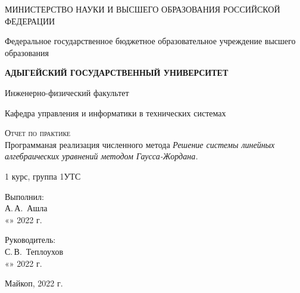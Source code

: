 \documentclass[12pt,a4paper]{scrartcl}
\begin{document}
	\begin{titlepage}
		\begin{center}
			\large
			МИНИСТЕРСТВО НАУКИ И ВЫСШЕГО ОБРАЗОВАНИЯ РОССИЙСКОЙ ФЕДЕРАЦИИ
			
			Федеральное государственное бюджетное образовательное учреждение высшего образования
			
			\textbf{АДЫГЕЙСКИЙ ГОСУДАРСТВЕННЫЙ УНИВЕРСИТЕТ}
			\vspace{0.25cm}
			
			Инженерно-физический факультет
			
			Кафедра управления и информатики в технических системах
			\vfill
			
			\vfill
			
			\textsc{Отчет по практике}\\[5mm]
			
			{\LARGE Программаная реализация численного метода \textit{Решение системы линейных алгебраических уравнений методом Гаусса-Жордана.}}
			\bigskip
			
			1 курс, группа 1УТС
		\end{center}
		\vfill
		
		\newlength{\ML}
		\hfill\begin{minipage}{0.5\textwidth}
			Выполнил:\\
			\underline{\hspace{\ML}} А.\,А.~Ашла\\
			«\underline{\hspace{0.7cm}}» \underline{\hspace{2cm}} 2022 г.
		\end{minipage}%
		\bigskip
		
		\hfill\begin{minipage}{0.5\textwidth}
			Руководитель:\\
			\underline{\hspace{\ML}} С.\,В.~Теплоухов\\
			«\underline{\hspace{0.7cm}}» \underline{\hspace{2cm}} 2022 г.
		\end{minipage}%
		\vfill
		
		\begin{center}
			Майкоп, 2022 г.
		\end{center}
	\end{titlepage}
\end{document}
